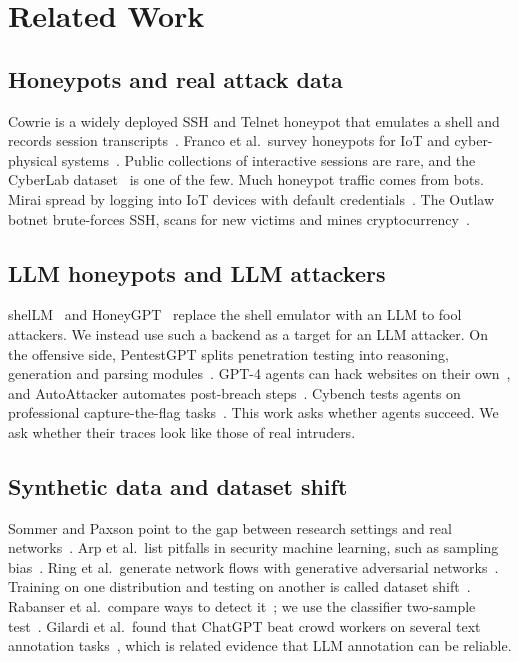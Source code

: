 \documentclass[conference]{IEEEtran}
\begin{document}
\section{Related Work}

\subsection{Honeypots and real attack data}
Cowrie is a widely deployed SSH and Telnet honeypot that emulates a shell and records session transcripts~\cite{oosterhof2015cowrie}. Franco et al.\ survey honeypots for IoT and cyber-physical systems~\cite{franco2021survey}. Public collections of interactive sessions are rare, and the CyberLab dataset~\cite{sedlar2020cyberlab} is one of the few. Much honeypot traffic comes from bots. Mirai spread by logging into IoT devices with default credentials~\cite{antonakakis2017mirai}. The Outlaw botnet brute-forces SSH, scans for new victims and mines cryptocurrency~\cite{trendmicro2018outlaw}.

\subsection{LLM honeypots and LLM attackers}
shelLM~\cite{sladic2023shellm} and HoneyGPT~\cite{wang2024honeygpt} replace the shell emulator with an LLM to fool attackers. We instead use such a backend as a target for an LLM attacker. On the offensive side, PentestGPT splits penetration testing into reasoning, generation and parsing modules~\cite{deng2024pentestgpt}. GPT-4 agents can hack websites on their own~\cite{fang2024hack}, and AutoAttacker automates post-breach steps~\cite{xu2024autoattacker}. Cybench tests agents on professional capture-the-flag tasks~\cite{zhang2025cybench}. This work asks whether agents succeed. We ask whether their traces look like those of real intruders.

\subsection{Synthetic data and dataset shift}
Sommer and Paxson point to the gap between research settings and real networks~\cite{sommer2010closed}. Arp et al.\ list pitfalls in security machine learning, such as sampling bias~\cite{arp2022dosdonts}. Ring et al.\ generate network flows with generative adversarial networks~\cite{ring2019gan}. Training on one distribution and testing on another is called dataset shift~\cite{quinonero2009dataset}. Rabanser et al.\ compare ways to detect it~\cite{rabanser2019failing}; we use the classifier two-sample test~\cite{lopezpaz2017c2st}. Gilardi et al.\ found that ChatGPT beat crowd workers on several text annotation tasks~\cite{gilardi2023chatgpt}, which is related evidence that LLM annotation can be reliable.
\end{document}
